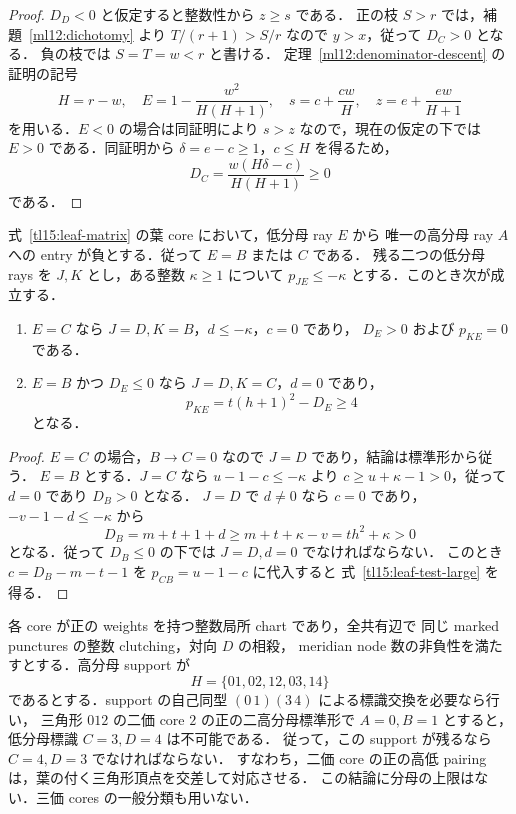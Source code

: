 \begin{proof}
$D_D<0$ と仮定すると整数性から $z\ge s$ である．
正の枝 $S>r$ では，補題~\ref{ml12:dichotomy} より
$T/(r+1)>S/r$ なので $y>x$，従って $D_C>0$ となる．
負の枝では $S=T=w<r$ と書ける．
定理~\ref{ml12:denominator-descent} の証明の記号
\[
 H=r-w,\quad E=1-\frac{w^2}{H(H+1)},\quad
 s=c+\frac{cw}{H},\quad z=e+\frac{ew}{H+1}
\]
を用いる．$E<0$ の場合は同証明により $s>z$ なので，現在の仮定の下では
$E>0$ である．同証明から $\delta=e-c\ge1$，$c\le H$ を得るため，
\[
 D_C=\frac{w(H\delta-c)}{H(H+1)}\ge0
\]
である．
\end{proof}

\begin{lemma}
\label{tl15:leaf-test}
式~\eqref{tl15:leaf-matrix} の葉 core において，低分母 ray $E$ から
唯一の高分母 ray $A$ への entry が負とする．従って $E=B$ または $C$ である．
残る二つの低分母 rays を $J,K$ とし，ある整数 $\kappa\ge1$ について
$p_{JE}\le-\kappa$ とする．このとき次が成立する．
\begin{enumerate}
\item $E=C$ なら $J=D,K=B$，$d\le-\kappa$，$c=0$ であり，
$D_E>0$ および $p_{KE}=0$ である．
\item $E=B$ かつ $D_E\le0$ なら $J=D,K=C$，$d=0$ であり，
\begin{equation}\label{tl15:leaf-test-large}
 p_{KE}=t(h+1)^2-D_E\ge4
\end{equation}
となる．
\end{enumerate}
\end{lemma}

\begin{proof}
$E=C$ の場合，$B\to C=0$ なので $J=D$ であり，結論は標準形から従う．
$E=B$ とする．$J=C$ なら $u-1-c\le-\kappa$ より
$c\ge u+\kappa-1>0$，従って $d=0$ であり $D_B>0$ となる．
$J=D$ で $d\ne0$ なら $c=0$ であり，
$-v-1-d\le-\kappa$ から
\[
 D_B=m+t+1+d\ge m+t+\kappa-v=th^2+\kappa>0
\]
となる．従って $D_B\le0$ の下では $J=D,d=0$ でなければならない．
このとき $c=D_B-m-t-1$ を $p_{CB}=u-1-c$ に代入すると
式~\eqref{tl15:leaf-test-large} を得る．
\end{proof}

\begin{theorem}
\label{tl15:crossed-pairing}
各 core が正の weights を持つ整数局所 chart であり，全共有辺で
同じ marked punctures の整数 clutching，対向 $D$ の相殺，
meridian node 数の非負性を満たすとする．高分母 support が
\[
 H=\{01,02,12,03,14\}
\]
であるとする．support の自己同型 $(0\,1)(3\,4)$ による標識交換を必要なら行い，
三角形 $012$ の二価 core $2$ の正の二高分母標準形で
$A=0,B=1$ とすると，低分母標識 $C=3,D=4$ は不可能である．
従って，この support が残るなら $C=4,D=3$ でなければならない．
すなわち，二価 core の正の高低 pairing は，葉の付く三角形頂点を交差して対応させる．
この結論に分母の上限はない．三価 cores の一般分類も用いない．
\end{theorem}


